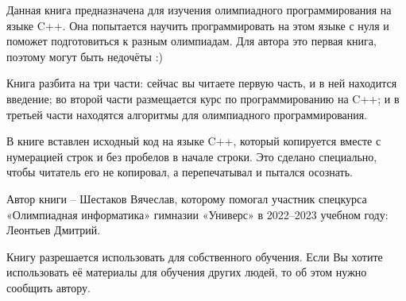 Данная книга предназначена для изучения олимпиадного программирования на языке C++. Она попытается научить программировать на этом языке с нуля и поможет подготовиться к разным олимпиадам. Для автора это первая книга, поэтому могут быть недочёты :)

Книга разбита на три части: сейчас вы читаете первую часть, и в ней находится введение; во второй части размещается курс по программированию на C++; и в третьей части находятся алгоритмы для олимпиадного программирования.

В книге вставлен исходный код на языке C++, который копируется вместе с нумерацией строк и без пробелов в начале строки. Это сделано специально, чтобы читатель его не копировал, а перепечатывал и пытался осознать.

Автор книги – Шестаков Вячеслав, которому помогал участник спецкурса «Олимпиадная информатика» гимназии «Универс» в 2022–2023 учебном году: Леонтьев Дмитрий.

Книгу разрешается использовать для собственного обучения. Если Вы хотите использовать её материалы для обучения других людей, то об этом нужно сообщить автору.
